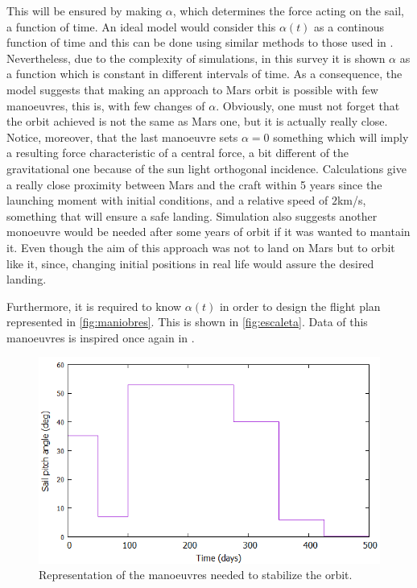 \documentclass[twocolumn,12pt,a4paper]{article}
\numberwithin{equation}{section}
\begin{document}
This will be ensured by making $\alpha$, which determines the force acting on the sail, a function of time. An ideal model would consider this $\alpha(t)$ as a continous function of time and this can be done using similar methods to those used in \cite{xinos}. Nevertheless, due to the complexity of simulations, in this survey it is shown $\alpha$ as a function which is constant in different intervals of time. As a consequence, the model suggests that making an approach to Mars orbit is possible with few manoeuvres, this is, with few changes of $\alpha$. Obviously, one must not forget that the orbit achieved is not the same as Mars one, but it is actually really close. Notice, moreover, that the last manoeuvre sets $\alpha=0$ something which will imply a resulting force characteristic of a central force, a bit different of the gravitational one because of the sun light orthogonal incidence. Calculations give a really close proximity between Mars and the craft within 5 years since the launching moment with initial conditions, and a relative speed of $2$km/s, something that will ensure a safe landing. Simulation also suggests another monoeuvre would be needed after some years of orbit if it was wanted to mantain it. Even though the aim of this approach was not to land on Mars but to orbit like it, since, changing initial positions in real life would assure the desired landing.

Furthermore, it is required to know $\alpha(t)$ in order to design the flight plan represented in \autoref{fig:maniobres}. This is shown in \autoref{fig:escaleta}. Data of this manoeuvres is inspired once again in \cite{xinos}.


\begin{figure}
	\label{fig:escaleta}
	\includegraphics[scale=0.35]{cocu.png}
	\caption{Representation of the manoeuvres needed to stabilize the orbit.}
\end{figure}
\end{document}
